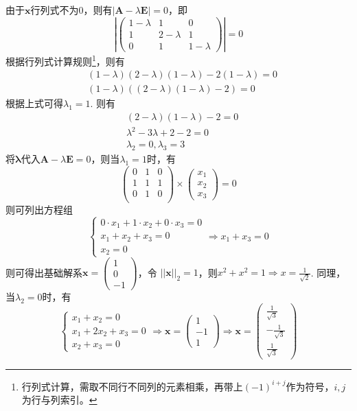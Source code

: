 \documentclass[12pt,a4paper]{article}
\begin{document}
  由于$\mathbf{x}$行列式不为0，则有$\left|\mathbf{A}-\lambda \mathbf{E}\right|=0$，即
  $$
    \left|\left(\begin{array}{ccc}
      1-\lambda & 1 & 0 \\ 
      1 & 2 - \lambda & 1 \\ 
      0 & 1 & 1 - \lambda 
    \end{array}\right)\right| = 0
  $$
  根据行列式计算规则\footnote{行列式计算，需取不同行不同列的元素相乘，再带上$(-1)^{i+j}$作为符号，$i, j$为行与列索引。}，则有
  $$
  \begin{aligned}
    & (1-\lambda)(2-\lambda)(1-\lambda) - 2(1-\lambda) = 0 \\ 
    & (1-\lambda)((2-\lambda)(1-\lambda)-2) = 0
  \end{aligned}
  $$
  根据上式可得$\lambda _1 = 1$. 则有
  $$
   \begin{aligned}
    & (2-\lambda)(1-\lambda)-2 = 0 \\ 
    & \lambda ^2 -3\lambda +2 - 2 = 0 \\ 
    & \lambda _2 = 0, \lambda _3 = 3
   \end{aligned}
  $$
  将$\mathbf{\lambda}$代入$\mathbf{A} - \lambda \mathbf{E}=0$，则当$\lambda _1 = 1$时，有 
  $$
  \left(\begin{array}{ccc}
    0 & 1 & 0 \\ 
    1 & 1 & 1 \\ 
    0 & 1 & 0 \\ 
  \end{array}\right)\times \left(\begin{array}{c}
    x_1 \\ 
    x _2 \\ 
    x _3 
  \end{array}\right) = 0
  $$
  则可列出方程组 
  $$
  \left\{\begin{array}{l}
    0\cdot x_1 + 1 \cdot x_2 + 0 \cdot x_3 = 0 \\ 
    x_1 + x_2 + x_3 = 0 \\ 
    x_2 = 0
  \end{array}\right. \Rightarrow x_1 + x_3 = 0
  $$
  则可得出基础解系$\mathbf{x} = \left(\begin{array}{c}
    1 \\ 
    0 \\ 
    -1
  \end{array}\right)$，令 $||\mathbf{x}||_2=1$，则$x^2+x^2=1 \Rightarrow x = \frac{1}{\sqrt{2}}$.
  同理，当$\lambda _2 = 0$时，有 
  $$
  \left\{\begin{array}{l}
    x_1 + x_2 = 0 \\ 
    x_1 + 2x_2+x_3 = 0 \\ 
    x_2 + x_3 = 0
  \end{array}\right. \Rightarrow \mathbf{x} = \left(\begin{array}{c}
    1 \\ 
    -1 \\ 
    1
  \end{array}\right) \Rightarrow \mathbf{x} = \left(\begin{array}{c}
    \frac{1}{\sqrt{3}} \\ 
    -\frac{1}{\sqrt{3}} \\ 
    \frac{1}{\sqrt{3}}
  \end{array}\right)
  $$
\end{document}
